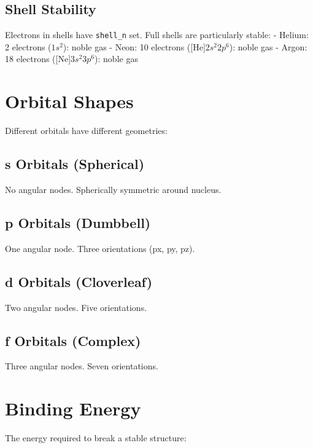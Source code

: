 \documentclass[
  11pt,
  letterpaper,
  twoside,
  openright]{book}
\begin{document}
\subsection{Shell Stability}\label{shell-stability}

Electrons in shells have \texttt{shell\_n} set. Full shells are
particularly stable: - Helium: 2 electrons (\(1s^2\)): noble gas - Neon:
10 electrons ({[}He{]}\(2s^2 2p^6\)): noble gas - Argon: 18 electrons
({[}Ne{]}\(3s^2 3p^6\)): noble gas

\section{Orbital Shapes}\label{orbital-shapes}

Different orbitals have different geometries:

\subsection{s Orbitals (Spherical)}\label{s-orbitals-spherical}

No angular nodes. Spherically symmetric around nucleus.

\subsection{p Orbitals (Dumbbell)}\label{p-orbitals-dumbbell}

One angular node. Three orientations (px, py, pz).

\subsection{d Orbitals (Cloverleaf)}\label{d-orbitals-cloverleaf}

Two angular nodes. Five orientations.

\subsection{f Orbitals (Complex)}\label{f-orbitals-complex}

Three angular nodes. Seven orientations.

\section{Binding Energy}\label{binding-energy}

The energy required to break a stable structure:
\end{document}
